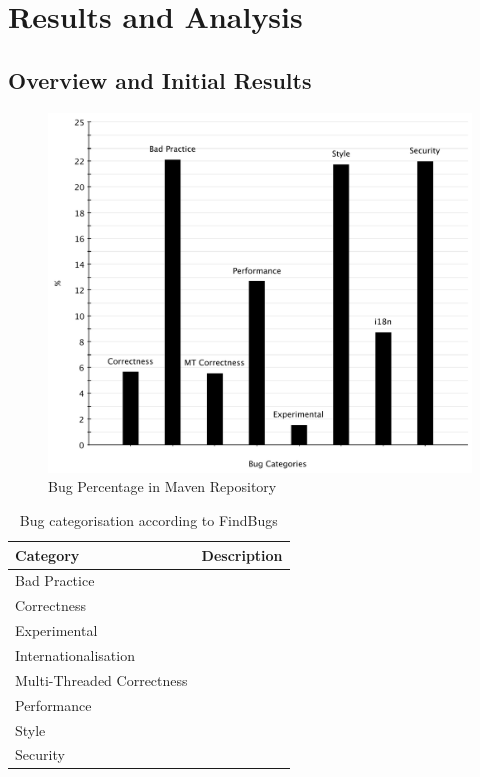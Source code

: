 \documentclass[conference]{IEEEtran}
\begin{document}
\section{Results and Analysis}
\label{sec:res}

\subsection{Overview and Initial Results}
\label{sec:overview}

\begin{figure}
	\centering
	\includegraphics[scale=0.6]{bug_percent}
	\caption{Bug Percentage in Maven Repository}
	\label{fig:bug-percentage}
\end{figure}

\begin{table}
\centering
\caption{Bug categorisation according to FindBugs}
\label{tbl:bug-categorisation}
\begin{tabular}{l r}
 \hline
Category & Description\\
\hline
Bad Practice & \\
Correctness & \\
Experimental & \\
Internationalisation & \\
Multi-Threaded Correctness & \\
Performance & \\
Style & \\
Security & \\
\hline
\end{tabular}
\end{table}
\end{document}
